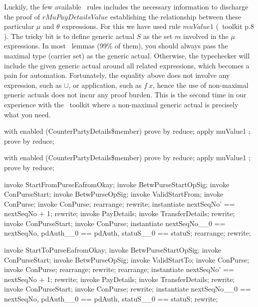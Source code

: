 Luckily, the few available \zeves\ rules includes the necessary
information to discharge the proof of $rMuPayDetailsValue$
establishing the relationship between these particular $\mu$ and
$\theta$ expressions. For this we have used rule $muValue1$ (\zeves\
toolkit p.$8$). The tricky bit is to define generic actual $S$ as
the set $m$ involved in the $\mu$ expressions. In most \zeves\
lemmas (99\% of them), you should always pass the maximal type
(carrier set) as the generic actual. Otherwise, the typechecker will
include the given generic actual around all related expressions,
which becomes a pain for automation. Fortunately, the equality above
does not involve any expression, such as $\cup$, or application,
such as $f~x$, hence the use of non-maximal generic actuals does not
incur any proof burden. This is the second time in our experience
with the \zeves\ toolkit where a non-maximal generic actual is
precisely what you need.
%
\begin{LPScript}\begin{zproof}[lStartFromMuPayDetailsEquivalence]
   with enabled (CounterPartyDetails\$member) prove by reduce;
   apply muValue1 ;
   prove by reduce;
\end{zproof}\end{LPScript}
%
\begin{LPScript}\begin{zproof}[lStartToMuPayDetailsEquivalence]
   with enabled (CounterPartyDetails\$member) prove by reduce;
   apply muValue1 ;
   prove by reduce;
\end{zproof}\end{LPScript}

\begin{LPScript}\begin{zproof}[tStartFromPurseEafromOkayPRE]
    invoke StartFromPurseEafromOkay;
    invoke BetwPurseStartOpSig;
    invoke \Xi ConPurseStart;
    invoke BetwPurseOpSig;
    invoke ValidStartFrom;
    invoke \Delta ConPurse;
    invoke ConPurse;
    rearrange;
    rewrite;
    instantiate nextSeqNo' == nextSeqNo + 1;
    rewrite;
    invoke PayDetails;
    invoke TransferDetails;
    rewrite;
    invoke ConPurseStart;
    invoke ConPurse;
    instantiate nextSeqNo\_\_0 == nextSeqNo,
        pdAuth\_\_0 == pdAuth, statuS\_\_0 == statuS;
    rearrange;
    rewrite;
\end{zproof}\end{LPScript}

\begin{LPScript}\begin{zproof}[tStartToPurseEafromOkayPRE]
    invoke StartToPurseEafromOkay;
    invoke BetwPurseStartOpSig;
    invoke \Xi ConPurseStart;
    invoke BetwPurseOpSig;
    invoke ValidStartTo;
    invoke \Delta ConPurse;
    invoke ConPurse;
    rearrange;
    rewrite;
    rearrange;
    instantiate nextSeqNo' == nextSeqNo + 1;
    rewrite;
    invoke PayDetails;
    invoke TransferDetails;
    rewrite;
    invoke ConPurseStart;
    invoke ConPurse;
    rewrite;
    instantiate nextSeqNo\_\_0 == nextSeqNo,
        pdAuth\_\_0 == pdAuth, statuS\_\_0 == statuS;
    rewrite;
\end{zproof}\end{LPScript}

